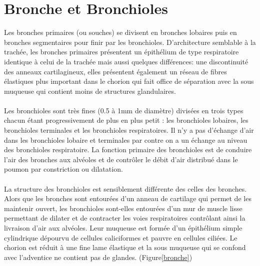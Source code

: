 		\section{Bronche et Bronchioles}
Les bronches primaires (ou souches) se divisent en bronches lobaires puis en bronches segmentaires pour finir par les bronchioles. D’architecture semblable à la trachée, les bronches primaires présentent un épithélium de type respiratoire identique à celui de la trachée mais aussi quelques différences: une discontinuité des anneaux cartilagineux, elles présentent également un réseau de fibres élastiques plus important dans le chorion qui fait office de séparation avec la sous muqueuse qui contient moins de structures glandulaires.\\
\\
Les bronchioles sont très fines (0.5 à 1mm de diamètre) divisées en trois types chacun étant progressivement de plus en plus petit : les bronchioles lobaires, les bronchioles terminales et les bronchioles respiratoires. Il n’y a pas d’échange d’air dans les bronchioles lobaire et terminales par contre on a un échange au niveau des bronchioles respiratoire. La fonction primaire des bronchioles est de conduire l’air des bronches aux alvéoles et de contrôler le débit d’air distribué dans le poumon par constriction ou dilatation. \\
\\
La structure des bronchioles est sensiblement différente des celles des bronches. Alors que les bronches sont entourées d’un anneau de cartilage qui permet de les maintenir ouvert, les bronchioles sont-elles entourées d’un mur de muscle lisse permettant de dilater et de contracter les voies respiratoires contrôlant ainsi la livraison d’air aux alvéoles. Leur muqueuse est formée d’un épithélium simple cylindrique dépourvu de cellules caliciformes et pauvre en cellules ciliées. Le chorion est réduit à une fine lame élastique et la sous muqueuse qui se confond avec l’adventice ne contient pas de glandes. (Figure\ref{bronche})

